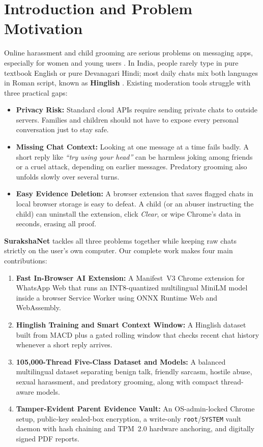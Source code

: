 \documentclass[11pt,a4paper]{article}
\begin{document}
\newpage

\section{Introduction and Problem Motivation}

Online harassment and child grooming are serious problems on messaging apps, especially for women and young users \cite{Mathew_Saha_Yimam_Biemann_Goyal_Mukherjee_2021}. In India, people rarely type in pure textbook English or pure Devanagari Hindi; most daily chats mix both languages in Roman script, known as \textbf{Hinglish} \cite{NEURIPS2022_a7c4163b}. Existing moderation tools struggle with three practical gaps:

\begin{itemize}
  \item \textbf{Privacy Risk:} Standard cloud APIs require sending private chats to outside servers. Families and children should not have to expose every personal conversation just to stay safe.
  \item \textbf{Missing Chat Context:} Looking at one message at a time fails badly. A short reply like \textit{``try using your head''} can be harmless joking among friends or a cruel attack, depending on earlier messages. Predatory grooming also unfolds slowly over several turns.
  \item \textbf{Easy Evidence Deletion:} A browser extension that saves flagged chats in local browser storage is easy to defeat. A child (or an abuser instructing the child) can uninstall the extension, click \textit{Clear}, or wipe Chrome's data in seconds, erasing all proof.
\end{itemize}

\textbf{SurakshaNet} tackles all three problems together while keeping raw chats strictly on the user's own computer. Our complete work makes four main contributions:

\begin{enumerate}
  \item \textbf{Fast In-Browser AI Extension:} A Manifest~V3 Chrome extension for WhatsApp Web that runs an INT8-quantized multilingual MiniLM model inside a browser Service Worker using ONNX Runtime Web and WebAssembly.
  \item \textbf{Hinglish Training and Smart Context Window:} A Hinglish dataset built from MACD plus a gated rolling window that checks recent chat history whenever a short reply arrives.
  \item \textbf{105{,}000-Thread Five-Class Dataset and Models:} A balanced multilingual dataset separating benign talk, friendly sarcasm, hostile abuse, sexual harassment, and predatory grooming, along with compact thread-aware models.
  \item \textbf{Tamper-Evident Parent Evidence Vault:} An OS-admin-locked Chrome setup, public-key sealed-box encryption, a write-only \texttt{root}/\texttt{SYSTEM} vault daemon with hash chaining and TPM~2.0 hardware anchoring, and digitally signed PDF reports.
\end{enumerate}
\end{document}
